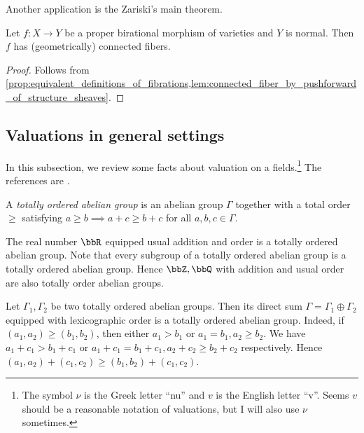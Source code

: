 Another application is the Zariski's main theorem.

\begin{corollary}
	Let $f:X \to Y$ be a proper birational morphism of varieties and $Y$ is normal.
	Then $f$ has (geometrically) connected fibers.
\end{corollary}
\begin{proof}
	Follows from \cref{prop:equivalent_definitions_of_fibrations,lem:connected_fiber_by_pushforward_of_structure_sheaves}.
\end{proof}



\subsection{Valuations in general settings}

In this subsection, we review some facts about valuation on a fields.\footnote{The symbol $\nu$ is the Greek letter ``nu'' and $v$ is the English letter ``v''. Seems $v$ should be a reasonable notation of valuations, but I will also use $\nu$ sometimes.}
The references are \cite{Günther-2016-valuation-theoretic-methods-birational-geometry,Vaquie-2006-valuations}.

\begin{definition}
	A \emph{totally ordered abelian group} is an abelian group $\Gamma$ together with a total order $\geq$ satisfying $a \geq b \implies a + c \geq b + c$ for all $a,b,c \in \Gamma$.
\end{definition}

\begin{example}
	The real number $\bbR$ equipped usual addition and order is a totally ordered abelian group.
	Note that every subgroup of a totally ordered abelian group is a totally ordered abelian group.
	Hence $\bbZ,\bbQ$ with addition and usual order are also totally order abelian groups.
\end{example}

\begin{example}
	Let $\Gamma_1,\Gamma_2$ be two totally ordered abelian groups.
	Then its direct sum $\Gamma = \Gamma_1 \oplus \Gamma_2$ equipped with lexicographic order is a totally ordered abelian group.
	Indeed, if $(a_1,a_2) \geq (b_1,b_2)$, then either $a_1 > b_1$ or $a_1 = b_1, a_2 \geq b_2$.
	We have $a_1 + c_1 > b_1 + c_1$ or $a_1 + c_1 = b_1 + c_1, a_2 + c_2 \geq b_2 + c_2$ respectively.
	Hence $(a_1,a_2) + (c_1,c_2) \geq (b_1,b_2) + (c_1,c_2)$.
\end{example}

